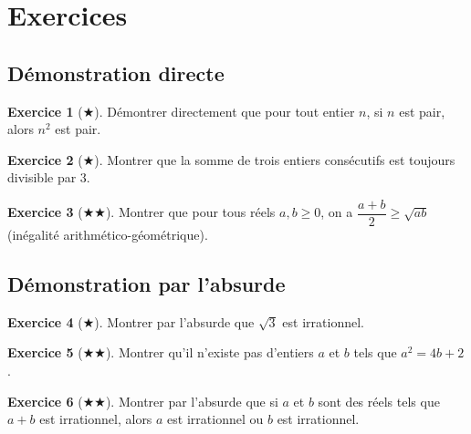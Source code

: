 \documentclass[12pt,a4paper,openany]{book}
\theoremstyle{definition}
\newtheorem{exercice}{Exercice}[chapter]
\theoremstyle{plain}
\theoremstyle{remark}
\begin{document}
\section{Exercices}
\label{sec:exo-demonstration}

\subsection*{D\'emonstration directe}

\begin{exercice}[$\bigstar$]\label{exo:direct-1}
  D\'emontrer directement que pour tout entier $n$, si $n$ est pair, alors $n^2$ est pair.
\end{exercice}

\begin{exercice}[$\bigstar$]\label{exo:direct-2}
  Montrer que la somme de trois entiers cons\'ecutifs est toujours divisible par $3$.
\end{exercice}

\begin{exercice}[$\bigstar\bigstar$]\label{exo:direct-3}
  Montrer que pour tous r\'eels $a, b \geq 0$, on a $\dfrac{a+b}{2} \geq \sqrt{ab}$ (in\'egalit\'e arithm\'etico-g\'eom\'etrique).
\end{exercice}

\subsection*{D\'emonstration par l'absurde}

\begin{exercice}[$\bigstar$]\label{exo:absurde-1}
  Montrer par l'absurde que $\sqrt{3}$ est irrationnel.
\end{exercice}

\begin{exercice}[$\bigstar\bigstar$]\label{exo:absurde-2}
  Montrer qu'il n'existe pas d'entiers $a$ et $b$ tels que $a^2 = 4b + 2$.
\end{exercice}

\begin{exercice}[$\bigstar\bigstar$]\label{exo:absurde-3}
  Montrer par l'absurde que si $a$ et $b$ sont des r\'eels tels que $a + b$ est irrationnel, alors $a$ est irrationnel ou $b$ est irrationnel.
\end{exercice}
\end{document}

